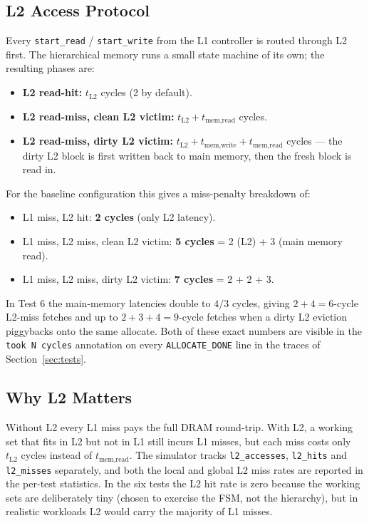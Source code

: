 \documentclass[11pt,a4paper]{article}
\begin{document}
\subsection{L2 Access Protocol}

Every \texttt{start\_read} / \texttt{start\_write} from the L1 controller is
routed through L2 first. The hierarchical memory runs a small state machine of
its own; the resulting phases are:

\begin{itemize}[leftmargin=1.4em,itemsep=0.1em]
    \item \textbf{L2 read-hit:} $t_{\text{L2}}$ cycles (2 by default).
    \item \textbf{L2 read-miss, clean L2 victim:}
    $t_{\text{L2}} + t_{\text{mem,read}}$ cycles.
    \item \textbf{L2 read-miss, dirty L2 victim:}
    $t_{\text{L2}} + t_{\text{mem,write}} + t_{\text{mem,read}}$ cycles —
    the dirty L2 block is first written back to main memory, then the fresh
    block is read in.
\end{itemize}

For the baseline configuration this gives a miss-penalty breakdown of:
\begin{itemize}[leftmargin=1.4em,itemsep=0.05em]
    \item L1 miss, L2 hit: \textbf{2 cycles} (only L2 latency).
    \item L1 miss, L2 miss, clean L2 victim: \textbf{5 cycles} = 2 (L2) + 3
    (main memory read).
    \item L1 miss, L2 miss, dirty L2 victim: \textbf{7 cycles} = 2 + 2 + 3.
\end{itemize}

In Test 6 the main-memory latencies double to $4/3$ cycles, giving
$2+4 = 6$-cycle L2-miss fetches and up to $2+3+4 = 9$-cycle fetches when a
dirty L2 eviction piggybacks onto the same allocate. Both of these exact
numbers are visible in the \texttt{took N cycles} annotation on every
\texttt{ALLOCATE\_DONE} line in the traces of Section~\ref{sec:tests}.

\subsection{Why L2 Matters}

Without L2 every L1 miss pays the full DRAM round-trip. With L2, a working
set that fits in L2 but not in L1 still incurs L1 misses, but each miss costs
only $t_{\text{L2}}$ cycles instead of $t_{\text{mem,read}}$. The simulator
tracks \texttt{l2\_accesses}, \texttt{l2\_hits} and \texttt{l2\_misses}
separately, and both the local and global L2 miss rates are reported in the
per-test statistics. In the six tests the L2 hit rate is zero because the
working sets are deliberately tiny (chosen to exercise the FSM, not the
hierarchy), but in realistic workloads L2 would carry the majority of L1
misses.
\end{document}
